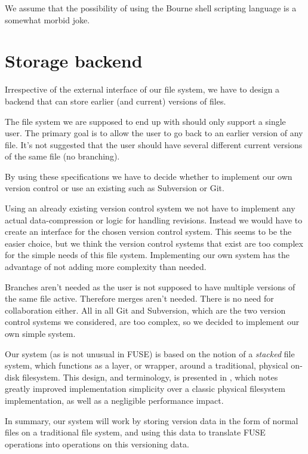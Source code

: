 \documentclass[12pt]{article}
\begin{document}
We assume that the possibility of using the Bourne shell scripting
language is a somewhat morbid joke.
 
\section{Storage backend}

Irrespective of the external interface of our file system, we have to
design a backend that can store earlier (and current) versions of
files.

The file system we are supposed to end up with should only support a
single user.  The primary goal is to allow the user to go back to an
earlier version of any file. It's not suggested that the user should
have several different current versions of the same file (no
branching).

By using these specifications we have to decide whether to implement
our own version control or use an existing such as Subversion or Git.

Using an already existing version control system we not have to
implement any actual data-compression or logic for handling revisions.
Instead we would have to create an interface for the chosen version
control system. This seems to be the easier choice, but we think the
version control systems that exist are too complex for the simple
needs of this file system. Implementing our own system has the
advantage of not adding more complexity than needed.

Branches aren't needed as the user is not supposed to have multiple
versions of the same file active. Therefore merges aren't needed.
There is no need for collaboration either. All in all Git and
Subversion, which are the two version control systems we considered,
are too complex, so we decided to implement our own simple system.

Our system (as is not unusual in FUSE) is based on the notion of a
\textit{stacked} file system, which functions as a layer, or wrapper,
around a traditional, physical on-disk filesystem.  This design, and
terminology, is presented in \cite{1096690}, which notes greatly
improved implementation simplicity over a classic physical filesystem
implementation, as well as a negligible performance impact.  

In summary, our system will work by storing version data in the form
of normal files on a traditional file system, and using this data to
translate FUSE operations into operations on this versioning data.
 
\end{document}
